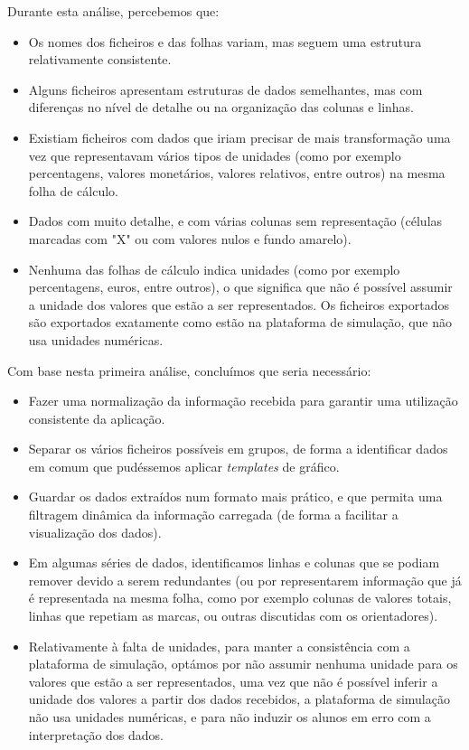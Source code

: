 Durante esta análise, percebemos que:

\begin{itemize}
    \item Os nomes dos ficheiros e das folhas variam, mas seguem uma estrutura relativamente consistente.   
    \item Alguns ficheiros apresentam estruturas de dados semelhantes, mas com diferenças no nível de detalhe ou na organização das colunas e linhas.   
    \item Existiam ficheiros com dados que iriam precisar de mais transformação uma vez que representavam vários tipos de unidades (como por exemplo percentagens, valores monetários, valores relativos, entre outros) na mesma folha de cálculo.  
    \item Dados com muito detalhe, e com várias colunas sem representação (células marcadas com "X" ou com valores nulos e fundo amarelo).  
    \item Nenhuma das folhas de cálculo indica unidades (como por exemplo percentagens, euros, entre outros), o que significa que não é possível assumir a unidade dos valores que estão a ser representados. Os ficheiros exportados são exportados exatamente como estão na plataforma de simulação, que não usa unidades numéricas.  
\end{itemize}

Com base nesta primeira análise, concluímos que seria necessário:
\begin{itemize}
    \item Fazer uma normalização da informação recebida para garantir uma utilização consistente da aplicação.
    \item Separar os vários ficheiros possíveis em grupos, de forma a identificar dados em comum que pudéssemos aplicar \textit{templates} de gráfico.
    \item Guardar os dados extraídos num formato mais prático, e que permita uma filtragem dinâmica da informação carregada (de forma a facilitar a visualização dos dados).
    \item Em algumas séries de dados, identificamos linhas e colunas que se podiam remover devido a serem redundantes (ou por representarem informação que já é representada na mesma folha, como por exemplo colunas de valores totais, linhas que repetiam as marcas, ou outras discutidas com os orientadores).
    \item Relativamente à falta de unidades, para manter a consistência com a plataforma de simulação, optámos por não assumir nenhuma unidade para os valores que estão a ser representados, uma vez que não é possível inferir a unidade dos valores a partir dos dados recebidos, a plataforma de simulação não usa unidades numéricas, e para não induzir os alunos em erro com a interpretação dos dados.
\end{itemize}

